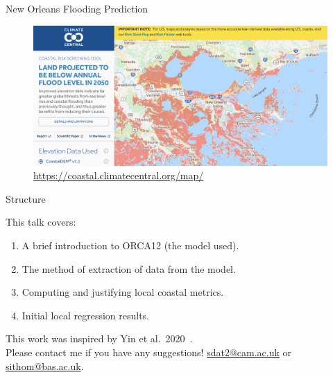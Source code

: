 \documentclass[usenames, dvipsnames]{beamer}
\begin{document}
\begin{frame}{New Orleans Flooding Prediction~\cite{kulp2019new, kulp2018coastaldem}}
\vspace{-20pt}
\begin{figure}[htb!]
    \centering
   \hspace{-20pt}
    \includegraphics[width=0.9\paperwidth]{images/example-images/new-orleans-surge.png}
    \vspace{-7pt}
    \caption{\url{https://coastal.climatecentral.org/map/}}
    \label{fig:}
\end{figure}
\end{frame}

\begin{frame}{Structure}

This talk covers:
\vspace{5pt}

\begin{enumerate}
    \item A brief introduction to ORCA12 (the model used).
    \item The method of extraction of data from the model.
    \item Computing and justifying local coastal metrics.
     \item Initial local regression results.
\end{enumerate}

\vspace{5pt}
This work was inspired by Yin et al.~2020~\cite{ZannaPreprint}.\\
Please contact me if you have any suggestions!
\href{mailto:sdat2@cam.ac.uk}{sdat2@cam.ac.uk}
or \href{mailto:sithom@bas.ac.uk}{sithom@bas.ac.uk}.
\begin{center}
\end{center}
\end{frame}
\end{document}
